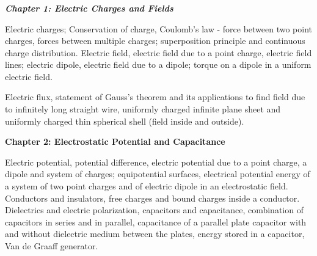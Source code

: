 \begin{frame}[t]
	\frametitle{}
	
	\noindent
	\begin{center}
	\end{center}
	
	\vspace{1em}
	
	\noindent
	\begin{minipage}[t]{\textwidth}
		\itshape\footnotesize
		\textbf{Chapter 1: Electric Charges and Fields}
		
		\vspace{0.3em}
		
		Electric charges; Conservation of charge, Coulomb's law - force between two point charges, forces between multiple charges; superposition principle and continuous charge distribution. Electric field, electric field due to a point charge, electric field lines; electric dipole, electric field due to a dipole; torque on a dipole in a uniform electric field.
		
		\vspace{0.4em}
		
		Electric flux, statement of Gauss's theorem and its applications to find field due to infinitely long straight wire, uniformly charged infinite plane sheet and uniformly charged thin spherical shell (field inside and outside).
		
		\vspace{0.4em}
		
		\textbf{Chapter 2: Electrostatic Potential and Capacitance}
		
		\vspace{0.3em}
		
		Electric potential, potential difference, electric potential due to a point charge, a dipole and system of charges; equipotential surfaces, electrical potential energy of a system of two point charges and of electric dipole in an electrostatic field. Conductors and insulators, free charges and bound charges inside a conductor. Dielectrics and electric polarization, capacitors and capacitance, combination of capacitors in series and in parallel, capacitance of a parallel plate capacitor with and without dielectric medium between the plates, energy stored in a capacitor, Van de Graaff generator.
	\end{minipage}
	
\end{frame}

